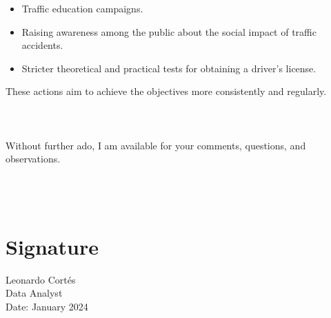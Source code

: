 \documentclass[12pt]{article}
\begin{document}
\begin{itemize}
    \item Traffic education campaigns.
    
    \item Raising awareness among the public about the social impact of traffic accidents.
    
    \item Stricter theoretical and practical tests for obtaining a driver's license.
    
\end{itemize}

These actions aim to achieve the objectives more consistently and regularly.
\\
\\
\\
\\
Without further ado, I am available for your comments, questions, and observations.
\\
\\
\\
\\

\section*{Signature}

Leonardo Cortés\\
Data Analyst \\
Date: January 2024
\end{document}
